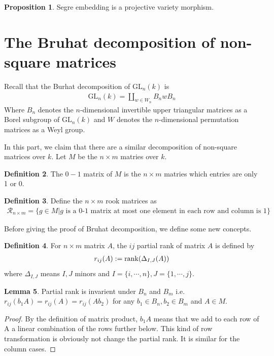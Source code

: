 \documentclass[10pt,UTF8]{article}
\theoremstyle{definition}
\renewcommand{\qed}{\rightline{$\qedsymbol$}}
\newcommand{\gl}{\text{GL}}
\newtheorem{definition}{Definition}[section]
\newtheorem{lemma}[definition]{Lemma}
\newtheorem{proposition}[definition]{Proposition}
\newtheorem*{proof}{Proof}
\begin{document}
\begin{proposition}
  Segre embedding is a projective variety morphism.
\end{proposition}


\newpage

\section{The Bruhat decomposition of non-square matrices}


Recall that the Burhat decomposition of $\gl_n(k)$ is 
\begin{align*}
  \gl_n(k) = \coprod_{w\in W_n} B_nwB_n
\end{align*}
Where $B_n$ denotes the $n$-dimensional invertible upper triangular matrices as a Borel subgroup of $\gl_n(k)$ and $W$ denotes the $n$-dimensional permutation matrices
as a Weyl group. 

In this part, we claim that there are a similar decomposition of non-square matrices over $k$.
Let $M$ be the $n\times m$ matries over $k$.

\begin{definition}
  The $0-1$ matrix of $M$ is the $n\times m$ matries which entries are only 1 or 0.
\end{definition}

\begin{definition}
  Define the $n\times m$ rook matrices as 
  \begin{align*}
    \mathcal{R}_{n\times m} = \{g\in M| \text{$g$ is a 0-1 matrix at most one element in each row and column is 1}\}
  \end{align*} 
\end{definition}




Before giving the proof of Bruhat decomposition, we define some new concepts.
\begin{definition}
  For $n\times m$ matrix $A$, the $ij$ partial rank of matrix $A$ is defined by
  \begin{align*}
    r_{ij}(A) := \operatorname{rank}(\Delta_{I,J}(A))
  \end{align*}
  where $\Delta_{I,J}$ means $I,J$ minors and $I=\{i,\cdots,n\},J=\{1,\cdots,j\}$.
\end{definition}

\begin{lemma}
  Partial rank is invarient under $B_n$ and $B_m$ i.e. $r_{ij}(b_1A) = r_{ij}(A) = r_{ij}(Ab_2)$ for any $b_1\in B_n,b_2\in B_m$ and $A\in M$.  \label{pr}
\end{lemma}
\begin{proof}
  By the definition of matrix product, $b_1A$ means that we add to each row of A a linear combination of the rows further below. 
  This kind of row transformation is obviously not change the partial rank. It is similar for the column cases.

  \qed
\end{proof}
\end{document}
